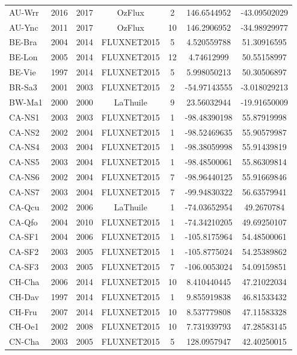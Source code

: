 \begin{center}
\begin{longtable}{lcccccc}
AU-Wrr & 2016 & 2017 & OzFlux      & 2      & 146.6544952  & -43.09502029 \\
AU-Ync & 2011 & 2017 & OzFlux      & 10     & 146.2906952  & -34.98929977 \\
BE-Bra & 2004 & 2014 & FLUXNET2015 & 5      & 4.520559788  & 51.30916595  \\
BE-Lon & 2005 & 2014 & FLUXNET2015 & 12     & 4.74612999   & 50.55158997  \\
BE-Vie & 1997 & 2014 & FLUXNET2015 & 5      & 5.998050213  & 50.30506897  \\
BR-Sa3 & 2001 & 2003 & FLUXNET2015 & 2      & -54.97143555 & -3.018029213 \\
BW-Ma1 & 2000 & 2000 & LaThuile    & 9      & 23.56032944  & -19.91650009 \\
CA-NS1 & 2003 & 2003 & FLUXNET2015 & 1      & -98.48390198 & 55.87919998  \\
CA-NS2 & 2002 & 2004 & FLUXNET2015 & 1      & -98.52469635 & 55.90579987  \\
CA-NS4 & 2003 & 2004 & FLUXNET2015 & 1      & -98.38059998 & 55.91439819  \\
CA-NS5 & 2003 & 2004 & FLUXNET2015 & 1      & -98.48500061 & 55.86309814  \\
CA-NS6 & 2002 & 2004 & FLUXNET2015 & 7      & -98.96440125 & 55.91669846  \\
CA-NS7 & 2003 & 2004 & FLUXNET2015 & 7      & -99.94830322 & 56.63579941  \\
CA-Qcu & 2002 & 2006 & LaThuile    & 1      & -74.03652954 & 49.2670784   \\
CA-Qfo & 2004 & 2010 & FLUXNET2015 & 1      & -74.34210205 & 49.69250107  \\
CA-SF1 & 2004 & 2006 & FLUXNET2015 & 1      & -105.8175964 & 54.48500061  \\
CA-SF2 & 2003 & 2005 & FLUXNET2015 & 1      & -105.8775024 & 54.25389862  \\
CA-SF3 & 2003 & 2005 & FLUXNET2015 & 7      & -106.0053024 & 54.09159851  \\
CH-Cha & 2006 & 2014 & FLUXNET2015 & 10     & 8.410440445  & 47.21022034  \\
CH-Dav & 1997 & 2014 & FLUXNET2015 & 1      & 9.855919838  & 46.81533432  \\
CH-Fru & 2007 & 2014 & FLUXNET2015 & 10     & 8.537779808  & 47.11583328  \\
CH-Oe1 & 2002 & 2008 & FLUXNET2015 & 10     & 7.731939793  & 47.28583145  \\
CN-Cha & 2003 & 2005 & FLUXNET2015 & 5      & 128.0957947  & 42.40250015  \\

\end{longtable}
\end{center}

